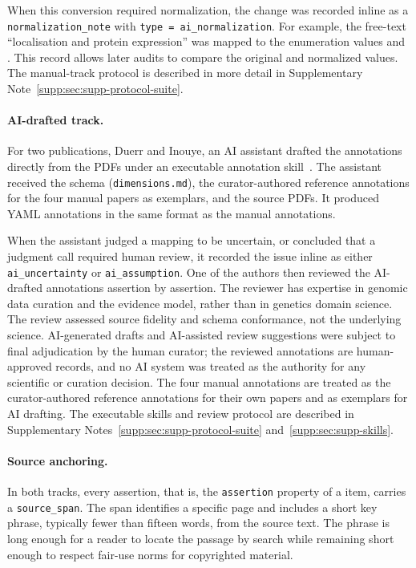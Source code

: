 When this conversion required normalization, the change was recorded
inline as a \texttt{normalization\_note} with
\texttt{type = ai\_normalization}. For example, the free-text
``localisation and protein expression'' was mapped to the enumeration
values  and . This record allows
later audits to compare the original and normalized values. The
manual-track protocol is described in more detail in Supplementary
Note~\ref*{supp:sec:supp-protocol-suite}.

\paragraph{AI-drafted track.}
For two publications, Duerr and Inouye, an AI assistant drafted the
annotations directly from the PDFs under an executable annotation
skill~\cite{anthropic_skills}. The assistant received the schema
(\texttt{dimensions.md}), the curator-authored reference annotations for the four
manual papers as exemplars, and the source PDFs. It produced YAML
annotations in the same format as the manual annotations.

When the assistant judged a mapping to be uncertain, or concluded that a
judgment call required human review, it recorded the issue inline as
either \texttt{ai\_uncertainty} or \texttt{ai\_assumption}. One of the
authors then reviewed the AI-drafted annotations assertion by assertion.
The reviewer has expertise in genomic data curation and the evidence
model, rather than in genetics domain science. The review assessed source
fidelity and schema conformance, not the underlying science. AI-generated
drafts and AI-assisted review suggestions were subject to final adjudication
by the human curator; the reviewed annotations are human-approved records,
and no AI system was treated as the authority for any scientific or
curation decision.
The four manual annotations are treated as the curator-authored reference
annotations for their own papers and as exemplars for AI drafting. The executable skills
and review protocol are described in Supplementary
Notes~\ref*{supp:sec:supp-protocol-suite}
and~\ref*{supp:sec:supp-skills}.

\paragraph{Source anchoring.}
In both tracks, every assertion, that is, the \texttt{assertion} property
of a \GeneticEvidence{} item, carries a \texttt{source\_span}. The span
identifies a specific page and includes a short key phrase, typically fewer
than fifteen words, from the source text. The phrase is long enough for a
reader to locate the passage by search while remaining short enough to
respect fair-use norms for copyrighted material.

